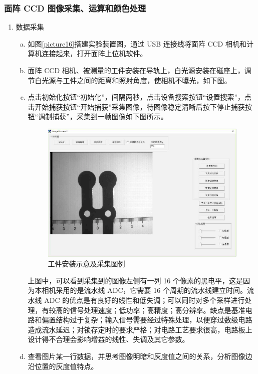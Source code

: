 \documentclass{ctexart}
\begin{document}
	\subsubsection{面阵 CCD 图像采集、运算和颜色处理}
	\begin{enumerate}[(1)]
		\item 数据采集
		\begin{enumerate}[(a)]
			\item 如图\ref{picture16}搭建实验装置图，通过 USB 连接线将面阵 CCD 相机和计算机连接起来，打开面阵上位机软件。
			\item 面阵 CCD 相机、被测量的工件安装在导轨上，白光源安装在磁座上，调节白光源与工件之间的距离和照射角度，使相机不曝光，如下图。
			\item 点击初始化按钮“初始化”，间隔两秒，点击设备搜索按钮“设置搜索”，点击开始捕获按钮“开始捕获”采集图像，待图像稳定清晰后按下停止捕获按钮“调制捕获”，采集到一帧图像如下图所示。
			\begin{figure}[H]
				\centering
				\includegraphics[scale=0.5]{4_1}
				\caption{工件安装示意及采集图例}
			\end{figure}
			上图中，可以看到采集到的图像左侧有一列 16 个像素的黑电平，这是因为本相机采用的是流水线 ADC，它需要 16 个周期的流水线建立时间。流水线 ADC 的优点是有良好的线性和低失调；可以同时对多个采样进行处理，有较高的信号处理速度；低功率；高精度；高分辨率。缺点是基准电路和偏置结构过于复杂；输入信号需要经过特殊处理，以便穿过数级电路造成流水延迟；对锁存定时的要求严格；对电路工艺要求很高，电路板上设计得不合理会影响增益的线性、失调及其它参数。
			\item 查看图片某一行数据，并思考图像明暗和灰度值之间的关系，分析图像边沿位置的灰度值特点。
			\begin{figure}[H]

\end{figure}
\end{enumerate}
\end{enumerate}
\end{document}
